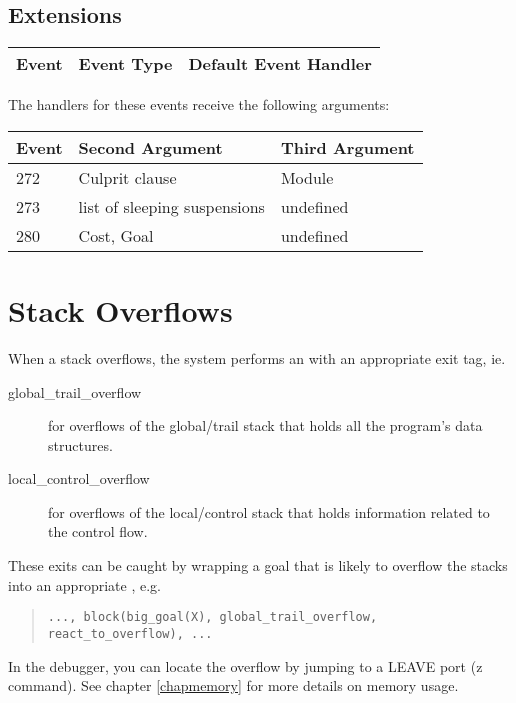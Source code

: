 \subsection{Extensions}
\begin{tabular}{|p{1.2cm}p{8cm}p{4.5cm}|}
\hline
{\bf Event} & {\bf Event Type} & {\bf Default Event Handler}\\
\hline

\hline
\end{tabular}

\vspace{0.5cm}

The handlers for these events receive the following arguments:

\noindent
\begin{tabular}{p{1.2cm}p{8cm}p{4.5cm}}
{\bf Event} & {\bf Second Argument} & {\bf Third Argument}\\
\hline
272 & Culprit clause & Module \\
273 & list of sleeping suspensions & undefined \\
280 & Cost, Goal & undefined \\
\hline
\end{tabular}

\section{Stack Overflows}
When a stack overflows, the system performs an
with an appropriate exit tag, ie.
\begin{description}
\item[global_trail_overflow] for overflows of the global/trail stack
	that holds all the program's data structures.
\item[local_control_overflow] for overflows of the local/control stack
	that holds information related to the control flow.
\end{description}
These exits can be caught by wrapping a goal that is likely
to overflow the stacks into an appropriate
, e.g.
\begin{quote}\begin{verbatim}
..., block(big_goal(X), global_trail_overflow, react_to_overflow), ...
\end{verbatim}\end{quote}
In the debugger, you can locate the overflow by jumping to a LEAVE port
(z command).
See chapter \ref{chapmemory} for more details on memory usage.


